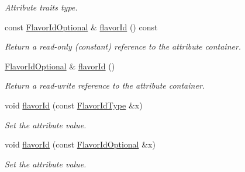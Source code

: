 \begin{DoxyCompactItemize}
\begin{DoxyCompactList}\small\item\em Attribute traits type. \item\end{DoxyCompactList}\item 
const \hyperlink{classopenstack_1_1xml_1_1Server_aa7fd9b502ebf6a05852889833fabe6cf}{FlavorIdOptional} \& \hyperlink{classopenstack_1_1xml_1_1Server_a1d40721bc243a3aa9783e61926475ec7}{flavorId} () const 
\begin{DoxyCompactList}\small\item\em Return a read-\/only (constant) reference to the attribute container. \item\end{DoxyCompactList}\item 
\hyperlink{classopenstack_1_1xml_1_1Server_aa7fd9b502ebf6a05852889833fabe6cf}{FlavorIdOptional} \& \hyperlink{classopenstack_1_1xml_1_1Server_ac3eabdd99d97d2c98e28508311bc8f9f}{flavorId} ()
\begin{DoxyCompactList}\small\item\em Return a read-\/write reference to the attribute container. \item\end{DoxyCompactList}\item 
void \hyperlink{classopenstack_1_1xml_1_1Server_aad6d7dbddddf82b011a614945a266d23}{flavorId} (const \hyperlink{classopenstack_1_1xml_1_1Server_a96ea9f0dc82d7606bcbcb38bf57ef5fb}{FlavorIdType} \&x)
\begin{DoxyCompactList}\small\item\em Set the attribute value. \item\end{DoxyCompactList}\item 
void \hyperlink{classopenstack_1_1xml_1_1Server_a3e0f3c46a79d4ec1bdfb185ab330edb0}{flavorId} (const \hyperlink{classopenstack_1_1xml_1_1Server_aa7fd9b502ebf6a05852889833fabe6cf}{FlavorIdOptional} \&x)
\begin{DoxyCompactList}\small\item\em Set the attribute value. \item\end{DoxyCompactList}\end{DoxyCompactItemize}
